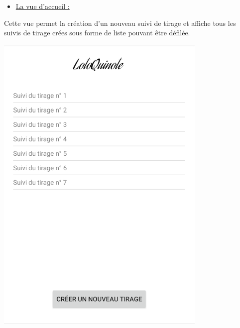 \documentclass{article}
\begin{document}
\begin{itemize}
\vspace{1em}
    \item {\underline {\large{La vue d'accueil :}}}
\end{itemize} 
    \noindent%
    \begin{minipage}{.6\textwidth}%
    Cette vue permet la création d'un nouveau suivi de tirage et affiche tous les suivis de tirage crées sous forme de liste pouvant être défilée. 
    \end{minipage}%
    \hfill
    \begin{minipage}{.35\textwidth}%
        \includegraphics[scale=0.6]{accueil.png}
    \end{minipage}%
    
\end{document}
